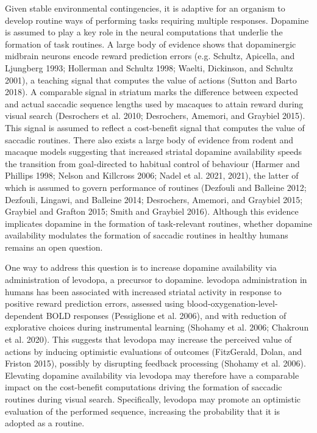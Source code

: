 \documentclass{article}
\begin{document}
Given stable environmental contingencies, it is adaptive for an organism
to develop routine ways of performing tasks requiring multiple
responses. Dopamine is assumed to play a key role in the neural
computations that underlie the formation of task routines. A large body
of evidence shows that dopaminergic midbrain neurons encode reward
prediction errors (e.g. Schultz, Apicella, and Ljungberg 1993; Hollerman
and Schultz 1998; Waelti, Dickinson, and Schultz 2001), a teaching
signal that computes the value of actions (Sutton and Barto 2018). A
comparable signal in striatum marks the difference between expected and
actual saccadic sequence lengths used by macaques to attain reward
during visual search (Desrochers et al. 2010; Desrochers, Amemori, and
Graybiel 2015). This signal is assumed to reflect a cost-benefit signal
that computes the value of saccadic routines. There also exists a large
body of evidence from rodent and macaque models suggesting that
increased striatal dopamine availability speeds the transition from
goal-directed to habitual control of behaviour (Harmer and Phillips
1998; Nelson and Killcross 2006; Nadel et al. 2021, 2021), the latter of
which is assumed to govern performance of routines (Dezfouli and
Balleine 2012; Dezfouli, Lingawi, and Balleine 2014; Desrochers,
Amemori, and Graybiel 2015; Graybiel and Grafton 2015; Smith and
Graybiel 2016). Although this evidence implicates dopamine in the
formation of task-relevant routines, whether dopamine availability
modulates the formation of saccadic routines in healthy humans remains
an open question.

One way to address this question is to increase dopamine availability
via administration of levodopa, a precursor to dopamine. levodopa
administration in humans has been associated with increased striatal
activity in response to positive reward prediction errors, assessed
using blood-oxygenation-level-dependent BOLD responses (Pessiglione et
al. 2006), and with reduction of explorative choices during instrumental
learning (Shohamy et al. 2006; Chakroun et al. 2020). This suggests that
levodopa may increase the perceived value of actions by inducing
optimistic evaluations of outcomes (FitzGerald, Dolan, and Friston
2015), possibly by disrupting feedback processing (Shohamy et al. 2006).
Elevating dopamine availability via levodopa may therefore have a
comparable impact on the cost-benefit computations driving the formation
of saccadic routines during visual search. Specifically, levodopa may
promote an optimistic evaluation of the performed sequence, increasing
the probability that it is adopted as a routine.
\end{document}

